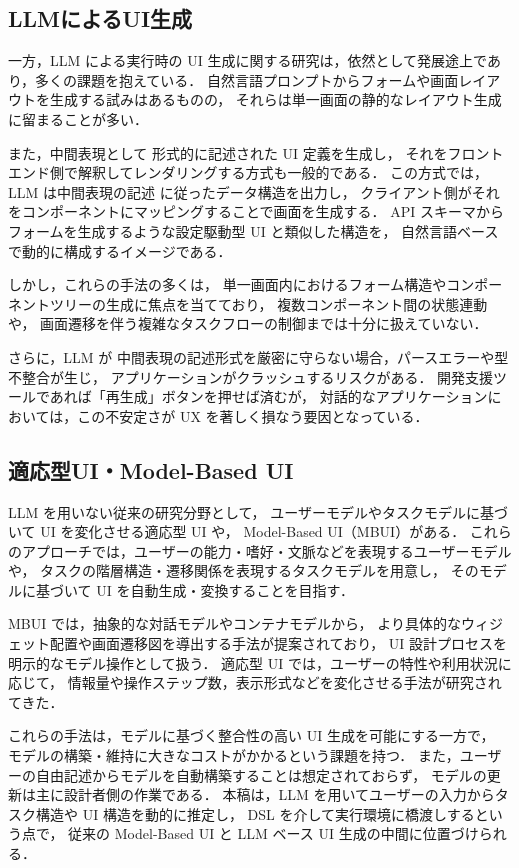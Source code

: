 \documentclass[a4paper,10pt]{jarticle}
\begin{document}
\subsection{LLMによるUI生成}

一方，LLM による実行時の UI 生成に関する研究は，依然として発展途上であり，多くの課題を抱えている．
自然言語プロンプトからフォームや画面レイアウトを生成する試み\cite{wu2024uicoder}はあるものの，
それらは単一画面の静的なレイアウト生成に留まることが多い．

また，中間表現として 形式的に記述された UI 定義を生成し，
それをフロントエンド側で解釈してレンダリングする方式も一般的である．
この方式では，LLM は中間表現の記述
に従ったデータ構造を出力し，
クライアント側がそれをコンポーネントにマッピングすることで画面を生成する．
API スキーマからフォームを生成するような設定駆動型 UI と類似した構造を，
自然言語ベースで動的に構成するイメージである\cite{chang2025generative}．

しかし，これらの手法の多くは，
単一画面内におけるフォーム構造やコンポーネントツリーの生成に焦点を当てており，
複数コンポーネント間の状態連動や，
画面遷移を伴う複雑なタスクフローの制御までは十分に扱えていない．

さらに，LLM が 中間表現の記述形式を厳密に守らない場合，パースエラーや型不整合が生じ，
アプリケーションがクラッシュするリスクがある．
開発支援ツールであれば「再生成」ボタンを押せば済むが，
対話的なアプリケーションにおいては，この不安定さが UX を著しく損なう要因となっている．

\subsection{適応型UI・Model-Based UI}

LLM を用いない従来の研究分野として，
ユーザーモデルやタスクモデルに基づいて UI を変化させる適応型 UI や，
Model-Based UI（MBUI）がある\cite{puerta1998mbui,myers1995uisoft}．
これらのアプローチでは，ユーザーの能力・嗜好・文脈などを表現するユーザーモデルや，
タスクの階層構造・遷移関係を表現するタスクモデルを用意し，
そのモデルに基づいて UI を自動生成・変換することを目指す\cite{gajos2007supple}．

MBUI では，抽象的な対話モデルやコンテナモデルから，
より具体的なウィジェット配置や画面遷移図を導出する手法が提案されており，
UI 設計プロセスを明示的なモデル操作として扱う．
適応型 UI では，ユーザーの特性や利用状況に応じて，
情報量や操作ステップ数，表示形式などを変化させる手法が研究されてきた\cite{barrera2014tukuchiy}．

これらの手法は，モデルに基づく整合性の高い UI 生成を可能にする一方で，
モデルの構築・維持に大きなコストがかかるという課題を持つ．
また，ユーザーの自由記述からモデルを自動構築することは想定されておらず，
モデルの更新は主に設計者側の作業である．
本稿は，LLM を用いてユーザーの入力からタスク構造や UI 構造を動的に推定し，
DSL を介して実行環境に橋渡しするという点で，
従来の Model-Based UI と LLM ベース UI 生成の中間に位置づけられる．
\end{document}
